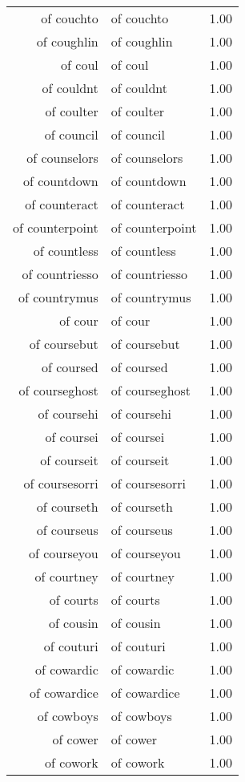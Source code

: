 \begin{table}[ht]
\begin{tabular}{rlr}
  of couchto & of couchto & 1.00 \\ 
  of coughlin & of coughlin & 1.00 \\ 
  of coul & of coul & 1.00 \\ 
  of couldnt & of couldnt & 1.00 \\ 
  of coulter & of coulter & 1.00 \\ 
  of council & of council & 1.00 \\ 
  of counselors & of counselors & 1.00 \\ 
  of countdown & of countdown & 1.00 \\ 
  of counteract & of counteract & 1.00 \\ 
  of counterpoint & of counterpoint & 1.00 \\ 
  of countless & of countless & 1.00 \\ 
  of countriesso & of countriesso & 1.00 \\ 
  of countrymus & of countrymus & 1.00 \\ 
  of cour & of cour & 1.00 \\ 
  of coursebut & of coursebut & 1.00 \\ 
  of coursed & of coursed & 1.00 \\ 
  of courseghost & of courseghost & 1.00 \\ 
  of coursehi & of coursehi & 1.00 \\ 
  of coursei & of coursei & 1.00 \\ 
  of courseit & of courseit & 1.00 \\ 
  of coursesorri & of coursesorri & 1.00 \\ 
  of courseth & of courseth & 1.00 \\ 
  of courseus & of courseus & 1.00 \\ 
  of courseyou & of courseyou & 1.00 \\ 
  of courtney & of courtney & 1.00 \\ 
  of courts & of courts & 1.00 \\ 
  of cousin & of cousin & 1.00 \\ 
  of couturi & of couturi & 1.00 \\ 
  of cowardic & of cowardic & 1.00 \\ 
  of cowardice & of cowardice & 1.00 \\ 
  of cowboys & of cowboys & 1.00 \\ 
  of cower & of cower & 1.00 \\ 
  of cowork & of cowork & 1.00 \\ 

\end{tabular}
\end{table}
